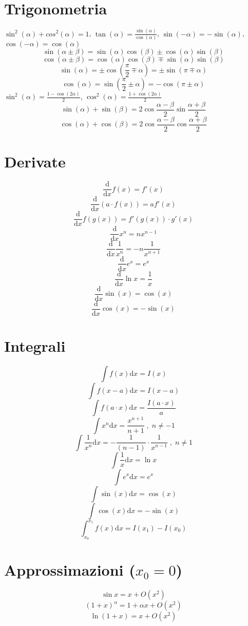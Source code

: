 \documentclass{article}
\begin{document}
\begin{small}
\begin{multicols}{3}
\section{Trigonometria}
		$ \sin^2 ( \alpha ) + cos^2 ( \alpha ) = 1 $, $ \tan ( \alpha ) = \frac{ \sin ( \alpha ) }{ \cos ( \alpha ) } $,
		$ \sin ( - \alpha ) = - \sin ( \alpha ) $, $ \cos ( - \alpha ) = \cos ( \alpha ) $
		\[ \sin ( \alpha \pm \beta ) = \sin ( \alpha ) \cos ( \beta ) \pm \cos ( \alpha ) \sin ( \beta ) \]
		\[ \cos ( \alpha \pm \beta ) = \cos ( \alpha ) \cos ( \beta ) \mp \sin ( \alpha ) \sin ( \beta ) \]
		\[ \sin ( \alpha ) = \pm \cos \left ( \frac{ \pi }{2} \mp \alpha \right ) = \pm \sin ( \pi \mp \alpha ) \]
		\[ \cos ( \alpha ) = \sin \left ( \frac{ \pi }{2} \pm \alpha \right ) = - \cos ( \pi \pm \alpha ) \]
		$ \sin^2 ( \alpha ) = \frac{ 1 - \cos ( 2 \alpha ) }{2} $, $ \cos^2 ( \alpha ) = \frac{ 1 + \cos ( 2 \alpha ) }{2} $
		\[ \sin ( \alpha ) + \sin ( \beta ) = 2 \cos \frac{ \alpha - \beta }{2} \sin \frac{ \alpha + \beta }{2} \]
		\[ \cos ( \alpha ) + \cos ( \beta ) = 2 \cos \frac{ \alpha - \beta }{2} \cos \frac{ \alpha + \beta }{2} \]
\section{Derivate}
		\[ \frac{ \mathrm d }{ \mathrm d x} f ( x ) = f' ( x ) \]
		\[ \frac{ \mathrm d }{ \mathrm d x} ( a \cdot f( x ) ) = a f' ( x ) \]
		\[ \frac{ \mathrm d }{ \mathrm d x} f ( g ( x ) ) = f' ( g ( x ) ) \cdot g' ( x ) \]
		\[ \frac{ \mathrm d }{ \mathrm d x} x^n = n x^{n-1} \]
		\[ \frac{ \mathrm d }{ \mathrm d x} \frac{1}{ x^n } = - n \frac{1}{ x^{n+1} } \]
		\[ \frac{ \mathrm d }{ \mathrm d x} e^x = e^x \]
		\[ \frac{ \mathrm d }{ \mathrm d x} \ln x = \frac{1}{ x } \]
		\[ \frac{ \mathrm d }{ \mathrm d x} \sin ( x ) = \cos ( x ) \]
		\[ \frac{ \mathrm d }{ \mathrm d x} \cos ( x ) = - \sin ( x ) \]
\section{Integrali}
		\[ \int f ( x ) \mathrm d x = I ( x ) \]
		\[ \int f ( x - a ) \mathrm d x = I ( x - a ) \]
		\[ \int f ( a \cdot x ) \mathrm d x = \frac{ I (a \cdot x) }{ a } \]
		\[ \int x^n \mathrm d x = \frac{ x^{n+1} }{ n+1 } \;,\; n \neq -1 \]
		\[ \int \frac{1}{ x^n } \mathrm d x = - \frac{1}{ ( n-1 ) } \cdot \frac{1}{ x^{n-1} } \;,\; n \neq 1 \]
		\[ \int \frac{1}{ x } \mathrm d x = \ln x \]
		\[ \int e^x \mathrm d x = e^x \]
		\[ \int \sin ( x ) \mathrm d x = \cos ( x ) \]
		\[ \int \cos ( x ) \mathrm d x = - \sin ( x ) \]
		\[ \int_{x_0}^{x_1} f ( x ) \mathrm d x = I ( x_1 ) - I ( x_0 ) \]
\section{Approssimazioni ($x_0 = 0$)}
		\[ \sin x = x + O ( x^2 ) \]
		\[ ( 1 + x )^{\alpha} = 1 + \alpha x + O ( x^2 ) \]
		\[ \ln ( 1 + x ) = x + O ( x^2 ) \]

	\end{multicols}
	\end{small}
\end{document}
